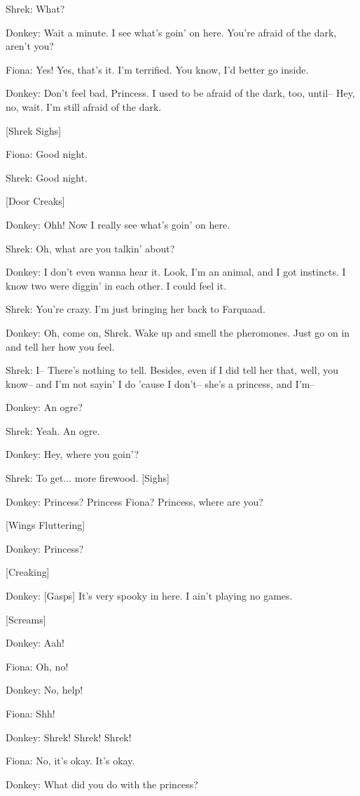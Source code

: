 \documentclass{article}
\begin{document}
Shrek:
What?

Donkey:
Wait a minute. I see what's goin' on here. You're afraid of the dark, aren't you?

Fiona:
Yes! Yes, that's it. I'm terrified. You know, I'd better go inside.

Donkey:
Don't feel bad, Princess. I used to be afraid of the dark, too, until-- Hey, no, wait. I'm still afraid of the dark.

[Shrek Sighs]

Fiona:
Good night.

Shrek:
Good night.

[Door Creaks]

Donkey:
Ohh! Now I really see what's goin' on here.

Shrek:
Oh, what are you talkin' about?

Donkey:
I don't even wanna hear it. Look, I'm an animal, and I got instincts. I know two were diggin' in each other. I could feel it.

Shrek:
You're crazy. I'm just bringing her back to Farquaad.

Donkey:
Oh, come on, Shrek. Wake up and smell the pheromones. Just go on in and tell her how you feel.

Shrek:
I-- There's nothing to tell. Besides, even if I did tell her that, well, you know-- and I'm not sayin' I do 'cause I don't-- she's a princess, and I'm--

Donkey:
An ogre?

Shrek:
Yeah. An ogre.

Donkey:
Hey, where you goin'?

Shrek:
To get... more firewood. [Sighs]

Donkey:
Princess? Princess Fiona? Princess, where are you?

[Wings Fluttering]

Donkey:
Princess?

[Creaking]

Donkey:
[Gasps] It's very spooky in here. I ain't playing no games.

[Screams]

Donkey:
Aah!

Fiona:
Oh, no!

Donkey:
No, help!

Fiona:
Shh!

Donkey:
Shrek! Shrek! Shrek!

Fiona:
No, it's okay. It's okay.

Donkey:
What did you do with the princess?
\end{document}
